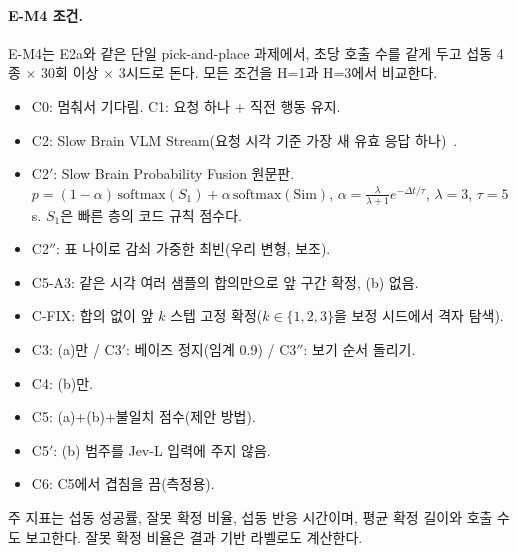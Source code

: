 \paragraph{E-M4 조건.}
E-M4는 E2a와 같은 단일 pick-and-place 과제에서, 초당 호출 수를 같게 두고 섭동 4종 $\times$ 30회 이상 $\times$ 3시드로 돈다. 모든 조건을 H=1과 H=3에서 비교한다.
\begin{itemize}
  \item C0: 멈춰서 기다림. C1: 요청 하나 + 직전 행동 유지.
  \item C2: Slow Brain VLM Stream(요청 시각 기준 가장 새 유효 응답 하나)~\cite{slowbrain2026}.
  \item C2$'$: Slow Brain Probability Fusion 원문판. $p=(1-\alpha)\,\mathrm{softmax}(S_1)+\alpha\,\mathrm{softmax}(\mathrm{Sim})$, $\alpha=\frac{\lambda}{\lambda+1}e^{-\Delta t/\tau}$, $\lambda=3$, $\tau=5$\,s. $S_1$은 빠른 층의 코드 규칙 점수다.
  \item C2$''$: 표 나이로 감쇠 가중한 최빈(우리 변형, 보조).
  \item C5-A3: 같은 시각 여러 샘플의 합의만으로 앞 구간 확정, (b) 없음.
  \item C-FIX: 합의 없이 앞 $k$ 스텝 고정 확정($k\in\{1,2,3\}$을 보정 시드에서 격자 탐색).
  \item C3: (a)만 / C3$'$: 베이즈 정지(임계 0.9) / C3$''$: 보기 순서 돌리기.
  \item C4: (b)만.
  \item C5: (a)+(b)+불일치 점수(제안 방법).
  \item C5$'$: (b) 범주를 Jev-L 입력에 주지 않음.
  \item C6: C5에서 겹침을 끔(측정용).
\end{itemize}
주 지표는 섭동 성공률, 잘못 확정 비율, 섭동 반응 시간이며, 평균 확정 길이와 호출 수도 보고한다. 잘못 확정 비율은 결과 기반 라벨로도 계산한다.

